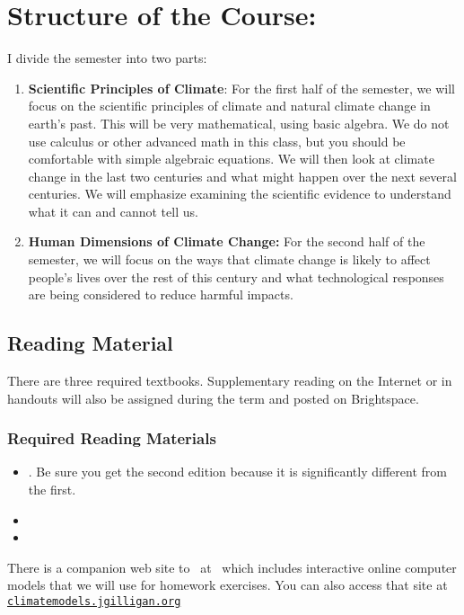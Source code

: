 \documentclass[11pt]{jgsyllabus}\usepackage[]{graphicx}\usepackage[]{xcolor}
\begin{document}
\section[Structure]{Structure of the Course:}
I divide the semester into two parts:
\begin{enumerate}
    \item \textbf{Scientific Principles of Climate}: For the first half of the semester,
    we will focus on the scientific principles of climate and natural climate change in earth's %
    past. This will be very mathematical, using basic algebra. We do not use calculus or
    other advanced math in this class, but you should be comfortable with simple algebraic
    equations.
    We will then
    look at climate change in the last two centuries and what might
    happen over the next several centuries. We will emphasize examining the
    scientific evidence to understand what it can and cannot tell us.
    \item \textbf{Human Dimensions of Climate Change:}
    For the
    second half of the semester, we will focus on the ways that climate change
    is likely to affect people's lives over the rest of this century and what
    technological responses are being considered to reduce harmful impacts.
\end{enumerate}
%
%
%
\subsection{Reading Material}
There are three required textbooks.
Supplementary reading on the Internet or in handouts will also be assigned during the term and posted on Brightspace.


\subsubsection[Required Reading]{Required Reading Materials}
\begin{itemize}
	\item \LongArcher. Be sure you get the second edition because it is significantly different from the first.
	\item \LongNordhaus
	\item \LongPielke
\end{itemize}

{\sloppy
There is a companion web site to \MedArcher\ at \ArcherURL\
which includes interactive online computer models that we will use for
homework exercises.
You can also access that site at
\href{https://climatemodels.jgilligan.org}{\nolinkurl{climatemodels.jgilligan.org}}
}
\end{document}
